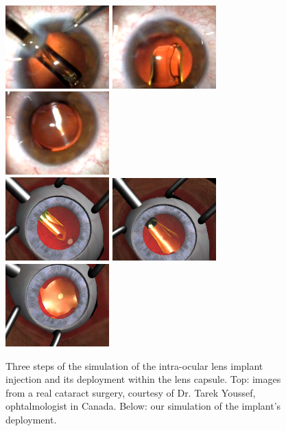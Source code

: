 \documentclass{llncs}
\begin{document}
\begin{figure}[!h]
\centering
\includegraphics[width=4cm]{images/surgery1}
\hfill
\includegraphics[width=4cm]{images/surgery2}
\hfill
\includegraphics[width=4cm]{images/surgery3} \\
\vspace{0.1cm}
\includegraphics[width=4cm]{images/simu1}
\hfill
\includegraphics[width=4cm]{images/simu2}
\hfill
\includegraphics[width=4cm]{images/simu3}
\caption [Lens imlant] {Three steps of the simulation of the intra-ocular lens implant injection and its deployment within the lens capsule. Top: images from a real cataract surgery, courtesy of Dr. Tarek Youssef, ophtalmologist in Canada. Below: our simulation of the implant's deployment.}
\label{fig-simu-results}
\end{figure}
\end{document}

